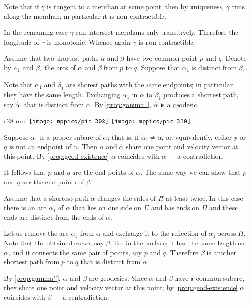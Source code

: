 Note that if $\gamma$ is tangent to a meridian at some point, then by uniqueness, $\gamma$ runs along the meridian; in particular it is non-contractible.

In the remaining case $\gamma$ can intersect meridians only transitively.
Therefore the longitude of $\gamma$ is monotonic.
Whence again $\gamma$ is non-contractible.

Assume that two shortest paths $\alpha$ and $\beta$ have two common point $p$ and $q$.
Denote by $\alpha_1$ and $\beta_1$ the arcs of
$\alpha$ and $\beta$ from $p$ to $q$.
Suppose that $\alpha_1$ is distinct from $\beta_1$.

Note that $\alpha_1$ and $\beta_1$ are shorest paths with the same endpoints;
in particular they have the same length.
Exchanging $\alpha_1$ in $\alpha$ to $\beta_1$ produces a shortest path, say $\hat\alpha$, that is distinct from $\alpha$.
By \ref{prop:gamma''}, $\hat\alpha$ is a geodesic.

\begin{wrapfigure}[11]{r}{38 mm}
\vskip-5mm
\centering
\texttt{[image: mppics/pic-308]}
\bigskip
\texttt{[image: mppics/pic-310]}
\vskip0mm
\end{wrapfigure}

Suppose $\alpha_1$ is a proper subarc of $\alpha$;
that is, if $\alpha_1\ne\alpha$, or, equivalently, either $p$ or $q$ is not an endpoint of $\alpha$.
Then $\alpha$ and $\hat\alpha$ share one point and velocity vector at this point.
By \ref{prop:geod-existence} $\alpha$ coincides with $\hat\alpha$ --- a contradiction.

It follows that $p$ and $q$ are the end points of $\alpha$.
The same way we can show that $p$ and $q$ are the end points of $\beta$.

Assume that a shortest path $\alpha$ changes the sides of $\Pi$ at least twice.
In this case there is an arc $\alpha_1$ of $\alpha$ that lies on one side on $\Pi$ and has ends on $\Pi$ and these ends are distinct from the ends of $\alpha$.

Let us remove the arc $\alpha_1$ from $\alpha$ and exchange it to the reflection of $\alpha_1$ across $\Pi$.
Note that the obtained curve, say $\beta$, lies in the surface; it has the same length as $\alpha$, and it connects the same pair of points, say $p$ and $q$.
Therefore $\beta$ is another shortest path from $p$ to $q$ that is distinct from $\alpha$.

By \ref{prop:gamma''}, $\alpha$ and $\beta$ are geodesics.
Since $\alpha$ and $\beta$ have a common subarc, they share one point and velocity vector at this point;
by \ref{prop:geod-existence} $\alpha$ coinsides with $\beta$ --- a contradiction.


